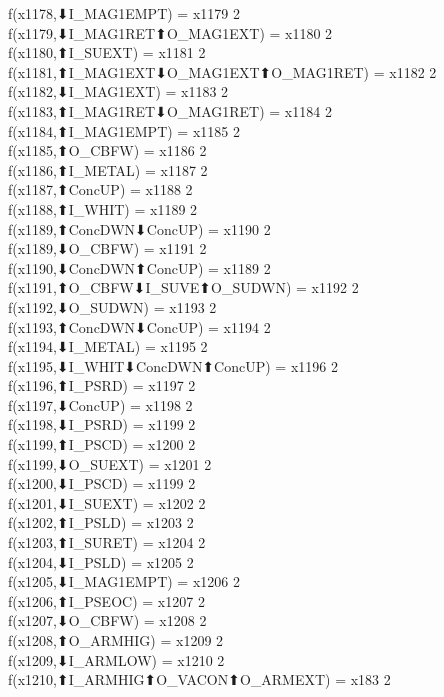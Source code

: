 f(x1178,⬇I_MAG1EMPT) = x1179 {2} \\
f(x1179,⬇I_MAG1RET⬆O_MAG1EXT) = x1180 {2} \\
f(x1180,⬆I_SUEXT) = x1181 {2} \\
f(x1181,⬆I_MAG1EXT⬇O_MAG1EXT⬆O_MAG1RET) = x1182 {2} \\
f(x1182,⬇I_MAG1EXT) = x1183 {2} \\
f(x1183,⬆I_MAG1RET⬇O_MAG1RET) = x1184 {2} \\
f(x1184,⬆I_MAG1EMPT) = x1185 {2} \\
f(x1185,⬆O_CBFW) = x1186 {2} \\
f(x1186,⬆I_METAL) = x1187 {2} \\
f(x1187,⬆ConcUP) = x1188 {2} \\
f(x1188,⬆I_WHIT) = x1189 {2} \\
f(x1189,⬆ConcDWN⬇ConcUP) = x1190 {2} \\
f(x1189,⬇O_CBFW) = x1191 {2} \\
f(x1190,⬇ConcDWN⬆ConcUP) = x1189 {2} \\
f(x1191,⬆O_CBFW⬇I_SUVE⬆O_SUDWN) = x1192 {2} \\
f(x1192,⬇O_SUDWN) = x1193 {2} \\
f(x1193,⬆ConcDWN⬇ConcUP) = x1194 {2} \\
f(x1194,⬇I_METAL) = x1195 {2} \\
f(x1195,⬇I_WHIT⬇ConcDWN⬆ConcUP) = x1196 {2} \\
f(x1196,⬆I_PSRD) = x1197 {2} \\
f(x1197,⬇ConcUP) = x1198 {2} \\
f(x1198,⬇I_PSRD) = x1199 {2} \\
f(x1199,⬆I_PSCD) = x1200 {2} \\
f(x1199,⬇O_SUEXT) = x1201 {2} \\
f(x1200,⬇I_PSCD) = x1199 {2} \\
f(x1201,⬇I_SUEXT) = x1202 {2} \\
f(x1202,⬆I_PSLD) = x1203 {2} \\
f(x1203,⬆I_SURET) = x1204 {2} \\
f(x1204,⬇I_PSLD) = x1205 {2} \\
f(x1205,⬇I_MAG1EMPT) = x1206 {2} \\
f(x1206,⬆I_PSEOC) = x1207 {2} \\
f(x1207,⬇O_CBFW) = x1208 {2} \\
f(x1208,⬆O_ARMHIG) = x1209 {2} \\
f(x1209,⬇I_ARMLOW) = x1210 {2} \\
f(x1210,⬆I_ARMHIG⬆O_VACON⬆O_ARMEXT) = x183 {2} \\
